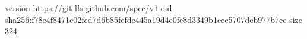 version https://git-lfs.github.com/spec/v1
oid sha256:f78e4f8471c02fcd7d6b85fefdc445a19d4e0fe8d3349b1ecc5707deb977b7ce
size 324

